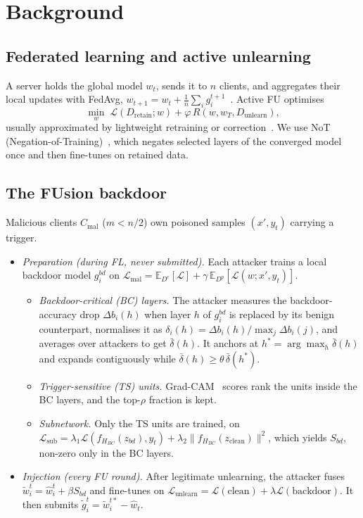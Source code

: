 \documentclass[conference]{IEEEtran}
\begin{document}
\section{Background}
\subsection{Federated learning and active unlearning}
A server holds the global model $w_t$, sends it to $n$ clients, and aggregates their local updates
with FedAvg, $w_{t+1}=w_t+\frac1n\sum_i g_i^{t+1}$~\cite{fedavg}. Active FU optimises
\begin{equation}
\min_w\; \mathcal{L}(D_{\text{retain}};w)+\varphi\,R(w,w_T,D_{\text{unlearn}}),
\end{equation}
usually approximated by lightweight retraining or correction~\cite{fusion}. We use NoT
(Negation-of-Training)~\cite{not}, which negates selected layers of the converged model once and
then fine-tunes on retained data.

\subsection{The FUsion backdoor~\cite{fusion}}
Malicious clients $C_{\text{mal}}$ ($m<n/2$) own poisoned samples $(x',y_t)$ carrying a trigger.
\begin{itemize}
\item \emph{Preparation (during FL, never submitted).} Each attacker trains a local backdoor
model $g^{bd}_i$ on $\mathcal{L}_{\text{mal}}=\mathbb{E}_{D^c}[\mathcal{L}]+\gamma\,
\mathbb{E}_{D^p}[\mathcal{L}(w;x',y_t)]$.
\begin{itemize}
\item \emph{Backdoor-critical (BC) layers.} The attacker measures the backdoor-accuracy drop
$\Delta b_i(h)$ when layer $h$ of $g^{bd}_i$ is replaced by its benign counterpart, normalises it as
$\delta_i(h)=\Delta b_i(h)/\max_j\Delta b_i(j)$, and averages over attackers to get $\bar\delta(h)$.
It anchors at $h^*=\arg\max_h\bar\delta(h)$ and expands contiguously while
$\bar\delta(h)\ge\theta\,\bar\delta(h^*)$.
\item \emph{Trigger-sensitive (TS) units.} Grad-CAM~\cite{gradcam} scores rank the units inside the
BC layers, and the top-$\rho$ fraction is kept.
\item \emph{Subnetwork.} Only the TS units are trained, on
$\mathcal{L}_{\text{sub}}=\lambda_1\mathcal{L}(f_{H_{BC}}(z_{bd}),y_t)+\lambda_2\|f_{H_{BC}}(z_{\text{clean}})\|^2$,
which yields $S_{bd}$, non-zero only in the BC layers.
\end{itemize}
\item \emph{Injection (every FU round).} After legitimate unlearning, the attacker fuses
$\tilde w_i^t=\hat w_i^t+\beta S_{bd}$ and fine-tunes on
$\mathcal{L}_{\text{unlearn}}=\mathcal{L}(\text{clean})+\lambda\mathcal{L}(\text{backdoor})$. It then
submits $\tilde g_i^t=\tilde w^{t*}_i-\hat w_t$.
\end{itemize}
\end{document}
